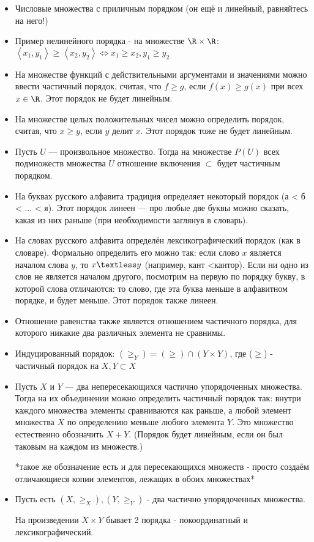 \begin{itemize}
	\item
		Числовые множества с приличным порядком (он ещё и линейный, равняйтесь на него!)
	\item
		Пример нелинейного порядка - на множестве $\R \times \R$: $\left<x_1, y_1\right> \geq \left<x_2, y_2\right> \iff x_1 \geq x_2, y_1 \geq y_2$
	\item
		На множестве функций с действительными аргументами и значениями можно ввести частичный порядок, считая, что $f \geq g$,
		 если $f(x) \geq g(x)$ при всех $x \in \R$. Этот порядок не будет линейным.
	\item
		На множестве целых положительных чисел можно определить порядок, считая, что $x \geq y$, если $y$ делит $x$. Этот порядок тоже не будет линейным.
	\item
		Пусть $U$ — произвольное множество. Тогда на множестве $P(U)$ всех подмножеств множества $U$ отношение включения $\subset$ будет частичным порядком.
	\item
		На буквах русского алфавита традиция определяет некоторый порядок (а < б < ... < я). Этот порядок линеен — про любые две буквы можно сказать, какая из них раньше (при необходимости заглянув в словарь).
	\item
		На словах русского алфавита определён лексикографический порядок (как в словаре). Формально определить его можно так: если слово $x$ является началом слова $y$, то $x \textless y$ (например, кант \textless кантор). Если ни одно из слов не является началом другого, посмотрим на первую по порядку букву, в которой слова отличаются: то слово, где эта буква меньше в алфавитном порядке, и будет меньше. Этот порядок также линеен.
	\item
		Отношение равенства также является отношением частичного порядка, для которого никакие два различных элемента не сравнимы.
\end{itemize}


\begin{itemize}
	\item
		Индуцированный порядок: $(\geq_Y) = (\geq) \cap (Y \times Y)$, где ($\geq$) - частичный порядок на $X, Y \subset X$
	\item
		Пусть $X$ и $Y$ — два непересекающихся частично упорядоченных множества. Тогда на их объединении можно определить 
		частичный порядок так: внутри каждого множества элементы сравниваются как раньше, а любой элемент множества $X$ по 
		определению меньше любого элемента $Y$. Это множество естественно обозначить $X + Y$.
		(Порядок будет линейным, если он был таковым на каждом из множеств.)
		
		*такое же обозначение есть и для пересекающихся множеств - просто создаём отличающиеся копии элементов, лежащих в обоих множествах*
	\item
		Пусть есть $(X, \geq_X), (Y, \geq_Y)$ - два частично упорядоченных множества.
		
		На произведении $X \times Y$ бывает 2 порядка - покоординатный и лексикографический. 
\end{itemize}

